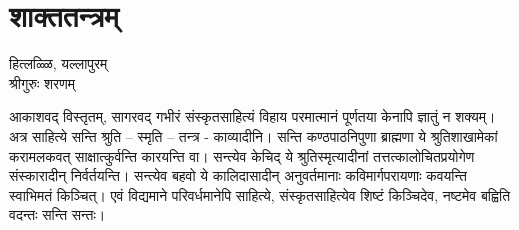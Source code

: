 \chapter{शाक्ततन्त्रम्}

\begin{center}
\smallskip
हित्लळ्ळि, यल्लापुरम्\\
श्रीगुरुः शरणम्
\addrule
\end{center}

आकाशवद् विस्तृतम्, सागरवद् गभीरं संस्कृतसाहित्यं विहाय परमात्मानं पूर्णतया केनापि ज्ञातुं न शक्यम्। अत्र साहित्ये सन्ति श्रुति – स्मृति – तन्त्र - काव्यादीनि। सन्ति कण्ठपाठनिपुणा ब्राह्मणा ये श्रुतिशाखामेकां करामलकवत् साक्षात्कुर्वन्ति कारयन्ति वा। सन्त्येव केचिद् ये श्रुतिस्मृत्यादीनां तत्तत्कालोचितप्रयोगेण संस्कारादीन् निर्वर्तयन्ति। सन्त्येव बहवो ये कालिदासादीन् अनुवर्तमानाः कविमार्गपरायणाः कवयन्ति स्वाभिमतं किञ्चित्। एवं विद्यमाने परिवर्धमानेपि साहित्ये, संस्कृतसाहित्येव शिष्टं किञ्चिदेव, नष्टमेव बह्विति वदन्तः सन्ति सन्तः।

